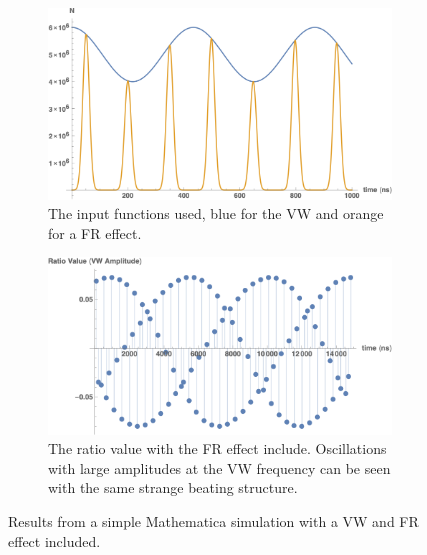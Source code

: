 \documentclass[12pt,letterpaper]{article}
\begin{document}
\begin{figure}[]
\centering
    \begin{subfigure}[t]{0.7\textwidth}
        \centering
        \includegraphics[width=\textwidth]{MathematicaMC_functionExample}
        \caption{The input functions used, blue for the VW and orange for a FR effect.}
    \end{subfigure}%
    \vspace{1cm}
    \begin{subfigure}[t]{0.7\textwidth}
        \centering
        \includegraphics[width=\textwidth]{MathematicaMC_withFR}
        \caption{The ratio value with the FR effect include. Oscillations with large amplitudes at the VW frequency can be seen with the same strange beating structure.}
    \end{subfigure}
\caption[]{Results from a simple Mathematica simulation with a VW and FR effect included.}
\label{fig:MathematicaMC_VW_FR}
\end{figure}
\end{document}
